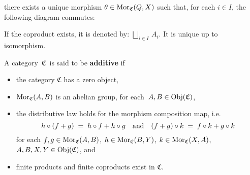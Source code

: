 \begin{definition}
\begin{itemize}
	there exists a unique morphism $\theta \in \textnormal{Mor}_{\mathfrak{C}}(Q,X)$ such that,
	for each $i \in I$, the following diagram commutes:
	\begin{center}
	\end{center}
	If the coproduct exists, it is denoted by: $\underset{i \in I}{\bigsqcup}\,A_{i}$.
	It is unique up to isomorphism.
\end{itemize}
\end{definition}


\vskip 0.5cm
\begin{definition}
\mbox{}
\vskip 0.15cm
\noindent
A category \,$\mathfrak{C}$\, is said to be \textbf{additive} if
\begin{itemize}
\item
	the category $\mathfrak{C}$ has a zero object,
\item
	$\textnormal{Mor}_{\mathfrak{C}}(A,B)$ is an abelian group, for each \,$A, B \in \textnormal{Obj}(\mathfrak{C})$,
\item
	the distributive law holds for the morphism composition map, i.e.
	\begin{equation*}
	h \circ (f + g) \; = \; h \circ f + h \circ g
	\quad\textnormal{and}\quad
	(f + g) \circ k \; = \; f \circ k + g \circ k
	\end{equation*}
	for each
	$f, g \in \textnormal{Mor}_{\mathfrak{C}}(A,B)$,
	$h \in \textnormal{Mor}_{\mathfrak{C}}(B,Y)$,
	$k \in \textnormal{Mor}_{\mathfrak{C}}(X,A)$,
	$A, B, X, Y \in \textnormal{Obj}(\mathfrak{C})$, and
\item
	finite products and finite coproducts exist in $\mathfrak{C}$.
\end{itemize}
\end{definition}


